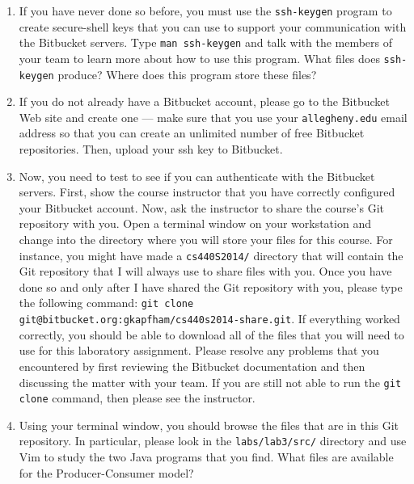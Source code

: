 \begin{enumerate}
	
  \item If you have never done so before, you must use the {\tt ssh-keygen} program to create secure-shell keys that you
    can use to support your communication with the Bitbucket servers.  Type {\tt man ssh-keygen} and talk with the
    members of your team to learn more about how to use this program.  What files does {\tt ssh-keygen} produce?  Where
    does this program store these files?

  \item If you do not already have a Bitbucket account, please go to the Bitbucket Web site and create one --- 
    make sure that you use your {\tt allegheny.edu} email address so that you can create an unlimited number of free
    Bitbucket repositories. Then, upload your ssh key to Bitbucket.

  \item Now, you need to test to see if you can authenticate with the Bitbucket servers.  First, show the course instructor that
    you have correctly configured your Bitbucket account.  Now, ask the instructor to share the course's Git repository with you.
    Open a terminal window on your workstation and change into the directory where you will store your files for this course.  For
    instance, you might have made a {\tt cs440S2014/} directory that will contain the Git repository that I will always use to
    share files with you.  Once you have done so and only after I have shared the Git repository with you, please type the
    following command: {\tt git clone git@bitbucket.org:gkapfham/cs440s2014-share.git}.  If everything worked correctly, you
    should be able to download all of the files that you will need to use for this laboratory assignment. Please resolve any
    problems that you encountered by first reviewing the Bitbucket documentation and then discussing the matter with your team. If
    you are still not able to run the {\tt git clone} command, then please see the instructor.

  \item Using your terminal window, you should browse the files that are in this Git repository.  In particular, please look in
    the {\tt labs/lab3/src/} directory and use Vim to study the two Java programs that you find. What files are available for the
    Producer-Consumer model?

\end{enumerate}

